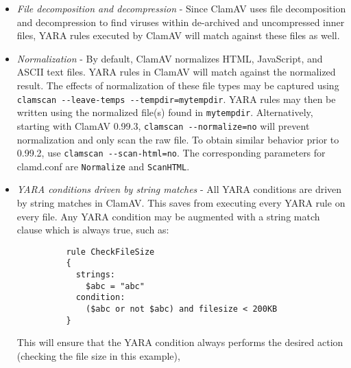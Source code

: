 \documentclass[a4paper,titlepage,12pt]{article}
\begin{document}
    \begin{itemize}
        \item \emph{File decomposition and decompression} - Since ClamAV uses file decomposition and decompression
               to find viruses within de-archived and uncompressed inner files, YARA rules executed by ClamAV
               will match against these files as well.
        \item \emph{Normalization} - By default, ClamAV normalizes HTML, JavaScript, and ASCII text files.
              YARA rules in ClamAV will match against the normalized result. The effects of normalization
              of these file types may be captured using \verb+clamscan --leave-temps --tempdir=mytempdir+. 
              YARA rules may then be written using the normalized file(s) found in \verb+mytempdir+.
              Alternatively, starting with ClamAV 0.99.3, \verb+clamscan --normalize=no+ will prevent
              normalization and only scan the raw file. To obtain similar behavior prior to 0.99.2, use
              \verb+clamscan --scan-html=no+. The corresponding parameters for clamd.conf are \verb+Normalize+
              and \verb+ScanHTML+.
        \item \emph{YARA conditions driven by string matches} - All YARA conditions are driven by string matches in
              ClamAV. This saves from executing every YARA rule on every file. Any YARA condition may be augmented
              with a string match clause which is always true, such as:
        \begin{verbatim}
          rule CheckFileSize
          {
            strings:
              $abc = "abc"
            condition:
              ($abc or not $abc) and filesize < 200KB
          }
        \end{verbatim}
        This will ensure that the YARA condition always performs the desired action (checking the file size in this example),
    \end{itemize}
    
\end{document}
